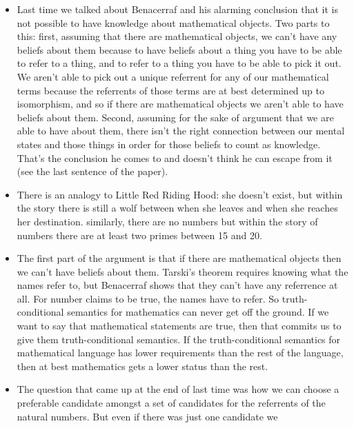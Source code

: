 \documentclass[12pt]{article}
\theoremstyle{definition}
\begin{document}
\begin{itemize}
    \itemsep0em 
    \item 
        Last time we talked about Benacerraf and his alarming conclusion that
        it is not possible to have knowledge about mathematical objects. Two
        parts to this: first, assuming that there are mathematical objects, we
        can't have any beliefs about them because to have beliefs about a thing
        you have to be able to refer to a thing, and to refer to a thing you
        have to be able to pick it out. We aren't able to pick out a unique
        referrent for any of our mathematical terms because the referrents of
        those terms are at best determined up to isomorphism, and so if there
        are mathematical objects we aren't able to have beliefs about them.
        Second, assuming for the sake of argument that we are able to have
        about them, there isn't the right connection between our mental states
        and those things in order for those beliefs to count as knowledge.
        That's the conclusion he comes to and doesn't think he can escape from
        it (see the last sentence of the paper). 
    \item
        There is an analogy to Little Red Riding Hood: she doesn't exist, but
        within the story there is still a wolf between when she leaves and when
        she reaches her destination. similarly, there are no numbers but within
        the story of numbers there are at least two primes between 15 and 20.
    \item
        The first part of the argument is that if there are mathematical
        objects then we can't have beliefs about them. Tarski's theorem
        requires knowing what the names refer to, but Benacerraf shows that
        they can't have any referrence at all. For number claims to be true,
        the names have to refer. So truth-conditional semantics for mathematics
        can never get off the ground. If we want to say that mathematical
        statements are true, then that commits us to give them
        truth-conditional semantics. If the truth-conditional semantics for
        mathematical language has lower requirements than the rest of the
        language, then at best mathematics gets a lower status than the rest. 
    \item
        The question that came up at the end of last time was how we can choose
        a preferable candidate amongst a set of candidates for the referrents
        of the natural numbers. But even if there was just one candidate we

\end{itemize}
\end{document}
